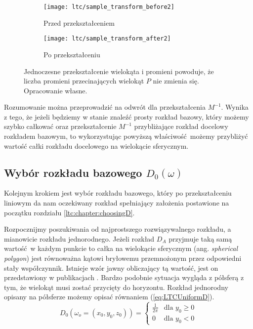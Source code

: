 \documentclass[../main.tex]{subfiles}
\begin{document}
\begin{figure}
    \centering
    \begin{subfigure}[t]{0.45\textwidth}
        \texttt{[image: ltc/sample\_transform\_before2]}
        \label{fig:LTCTransformBefore}
        \caption{Przed przekształceniem}
    \end{subfigure}
    \hspace{0.05\textwidth}
    \begin{subfigure}[t]{0.45\textwidth}
        \centering
        \texttt{[image: ltc/sample\_transform\_after2]}
        \label{fig:LTCTransformAfter}
        \caption{Po przekształceniu}
    \end{subfigure}
    
    \caption{Jednoczesne przekształcenie wielokąta i promieni powoduje, że liczba promieni przecinających wielokąt $P$ nie zmienia się. Opracowanie własne.}
    \label{fig:LTCTransformBeforeAfter}
\end{figure}

Rozumowanie można przeprowadzić na odwrót dla przekształcenia $M^{-1}$. Wynika z tego, że jeżeli będziemy w stanie znaleźć prosty rozkład bazowy, który możemy szybko całkować oraz przekształcenie $M^{-1}$ przybliżające rozkład docelowy rozkładem bazowym, to wykorzystując powyższą właściwość możemy przybliżyć wartość całki rozkładu docelowego na wielokącie sferycznym.


\subsection{Wybór rozkładu bazowego $D_0(\omega)$}

Kolejnym krokiem jest wybór rozkładu bazowego, który po przekształceniu liniowym da nam oczekiwany rozkład spełniający założenia postawione na początku rozdziału \ref{ltc:chapter:choosingD}.

Rozpocznijmy poszukiwania od najprostszego rozwiązywalnego rozkładu, a mianowicie rozkładu jednorodnego. Jeżeli rozkład $D_A$ przyjmuje taką samą wartość w każdym punkcie to całka na wielokącie sferycznym (ang. \textit{spherical polygon}) jest równoważna kątowi bryłowemu przemnożonym przez odpowiedni stały współczynnik. Istnieje wzór jawny obliczający tą wartość, jest on przedstawiony w publikacjach \cite{Arvo,Snyder}. Bardzo podobnie sytuacja wygląda z półsferą z tym, że wielokąt musi zostać przycięty do horyzontu. Rozkład jednorodny opisany na półsferze możemy opisać równaniem (\ref{eq:LTCUniformD}).
\begin{equation}
D_0(\omega_o=(x_0, y_0, z_0)) = \begin{cases}
  \frac{1}{2\pi} & \text{dla } y_0 \geq 0 \\
  0 & \text{dla } y_0 < 0
\end{cases}
\label{eq:LTCUniformD}
\end{equation}
\end{document}
